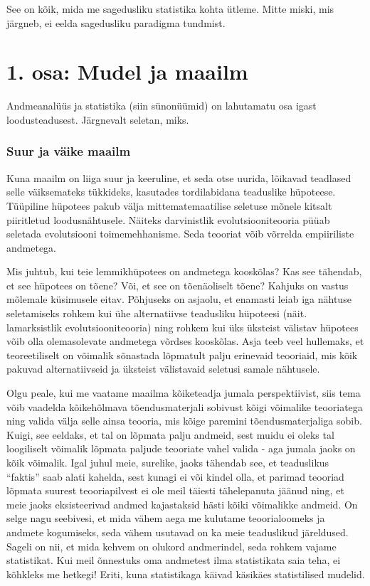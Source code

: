\documentclass[]{book}
\begin{document}
See on kõik, mida me sagedusliku statistika kohta ütleme. Mitte miski,
mis järgneb, ei eelda sagedusliku paradigma tundmist.

\chapter{1. osa: Mudel ja maailm}\label{osa-mudel-ja-maailm}

Andmeanalüüs ja statistika (siin sünonüümid) on lahutamatu osa igast
loodusteadusest. Järgnevalt seletan, miks.

\subsection{Suur ja väike maailm}\label{suur-ja-vaike-maailm}

Kuna maailm on liiga suur ja keeruline, et seda otse uurida, lõikavad
teadlased selle väiksemateks tükkideks, kasutades tordilabidana
teaduslike hüpoteese. Tüüpiline hüpotees pakub välja mittematemaatilise
seletuse mõnele kitsalt piiritletud loodusnähtusele. Näiteks
darvinistlik evolutsiooniteooria püüab seletada evolutsiooni
toimemehhanisme. Seda teooriat võib võrrelda empiiriliste andmetega.

Mis juhtub, kui teie lemmikhüpotees on andmetega kooskõlas? Kas see
tähendab, et see hüpotees on tõene? Või, et see on tõenäoliselt tõene?
Kahjuks on vastus mõlemale küsimusele eitav. Põhjuseks on asjaolu, et
enamasti leiab iga nähtuse seletamiseks rohkem kui ühe alternatiivse
teadusliku hüpoteesi (näit. lamarksistlik evolutsiooniteooria) ning
rohkem kui üks üksteist välistav hüpotees võib olla olemasolevate
andmetega võrdses kooskõlas. Asja teeb veel hullemaks, et teoreetiliselt
on võimalik sõnastada lõpmatult palju erinevaid teooriaid, mis kõik
pakuvad alternatiivseid ja üksteist välistavaid seletusi samale
nähtusele.

Olgu peale, kui me vaatame maailma kõiketeadja jumala perspektiivist,
siis tema võib vaadelda kõikehõlmava tõendusmaterjali sobivust kõigi
võimalike teooriatega ning valida välja selle ainsa teooria, mis kõige
paremini tõendusmaterjaliga sobib. Kuigi, see eeldaks, et tal on lõpmata
palju andmeid, sest muidu ei oleks tal loogiliselt võimalik lõpmata
paljude teooriate vahel valida - aga jumala jaoks on kõik võimalik. Igal
juhul meie, surelike, jaoks tähendab see, et teaduslikus ``faktis'' saab
alati kahelda, sest kunagi ei või kindel olla, et parimad teooriad
lõpmata suurest teooriapilvest ei ole meil täiesti tähelepanuta jäänud
ning, et meie jaoks eksisteerivad andmed kajastaksid hästi kõiki
võimalikke andmeid. On selge nagu seebivesi, et mida vähem aega me
kulutame teoorialoomeks ja andmete kogumiseks, seda vähem usutavad on ka
meie teaduslikud järeldused. Sageli on nii, et mida kehvem on olukord
andmerindel, seda rohkem vajame statistikat. Kui meil õnnestuks oma
andmetest ilma statistikata saia teha, ei kõhkleks me hetkegi! Eriti,
kuna statistikaga käivad käsikäes statistilised mudelid.
\end{document}
